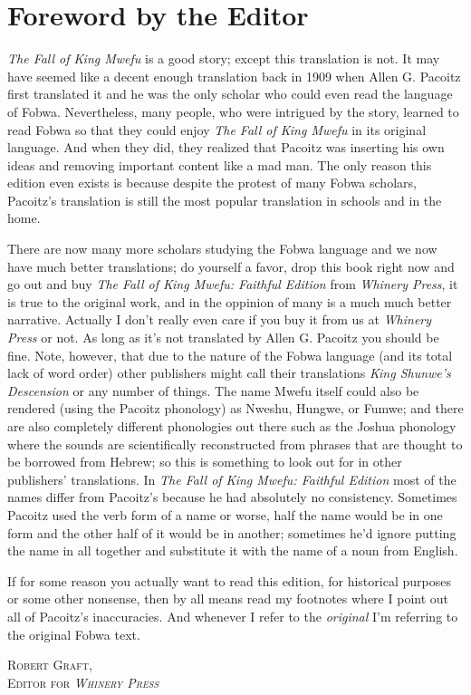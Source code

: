 \documentclass[openany, twoside, 12pt, extrafontsizes]{memoir}
\begin{document}
\chapter*{Foreword by the Editor}
\emph{The Fall of King Mwefu} is a good story; except this translation is not.
It may have seemed like a decent enough translation back in 1909 when Allen G. Pacoitz first translated it and he was the only scholar who could even read the language of Fo\-bwa.
Nevertheless, many people, who were intrigued by the story, learned to read Fo\-bwa so that they could enjoy \emph{The Fall of King Mwefu} in its original language.
And when they did, they realized that Pacoitz was inserting his own ideas and removing important content like a mad man.
The only reason this edition even exists is because despite the protest of many Fo\-bwa scholars, Pacoitz's translation is still the most popular translation in schools and in the home. 

There are now many more scholars studying the Fo\-bwa language and we now have much better translations;
do yourself a favor, drop this book right now and go out and buy \emph{The Fall of King Mwefu: Faithful Edition} from \emph{Whinery Press}, it is true to the original work, and in the oppinion of many is a much much better narrative.
Actually I don't really even care if you buy it from us at \emph{Whinery Press} or not.
As long as it's not translated by Allen G. Pacoitz you should be fine.
Note, however, that due to the nature of the Fo\-bwa language (and its total lack of word order) other publishers might call their translations \emph{King Shunwe's Descension} or any number of things. The name Mwefu itself could also be rendered (using the Pacoitz phonology) as Nweshu, Hungwe, or Fumwe; and there are also completely different phonologies out there such as the Joshua phonology where the sounds are scientifically reconstructed from phrases that are thought to be borrowed from Hebrew; so this is something to look out for in other publishers' translations. In \emph{The Fall of King Mwefu: Faithful Edition} most of the names differ from Pacoitz's because he had absolutely no consistency. Sometimes Pacoitz used the verb form of a name or worse, half the name would be in one form and the other half of it would be in another; sometimes he'd ignore putting the name in all together and substitute it with the name of a noun from English.

If for some reason you actually want to read this edition, for historical purposes or some other nonsense, then by all means read my footnotes where I point out all of Pacoitz's inaccuracies. And whenever I refer to the \emph{original} I'm referring to the original Fo\-bwa text.
\begin{flushright}
\textsc{
Robert Graft,\\
Editor for \emph{Whinery Press}}
\end{flushright}
\end{document}
